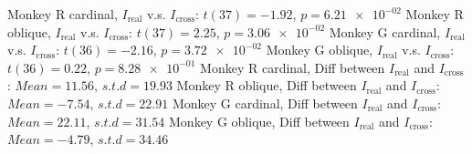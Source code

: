Monkey R cardinal, $I_\textrm{real}$ v.s. $I_\textrm{cross}$: $t(37) = -1.92$, $p = \num{6.21e-02}$ 
Monkey R oblique, $I_\textrm{real}$ v.s. $I_\textrm{cross}$: $t(37) = 2.25$, $p = \num{3.06e-02}$ 
Monkey G cardinal, $I_\textrm{real}$ v.s. $I_\textrm{cross}$: $t(36) = -2.16$, $p = \num{3.72e-02}$ 
Monkey G oblique, $I_\textrm{real}$ v.s. $I_\textrm{cross}$: $t(36) = 0.22$, $p = \num{8.28e-01}$ 
Monkey R cardinal, Diff between $I_\textrm{real}$ and $I_\textrm{cross}$: $Mean = 11.56$, $s.t.d = 19.93$
Monkey R oblique, Diff between $I_\textrm{real}$ and $I_\textrm{cross}$: $Mean = -7.54$, $s.t.d = 22.91$
Monkey G cardinal, Diff between $I_\textrm{real}$ and $I_\textrm{cross}$: $Mean = 22.11$, $s.t.d = 31.54$
Monkey G oblique, Diff between $I_\textrm{real}$ and $I_\textrm{cross}$: $Mean = -4.79$, $s.t.d = 34.46$
